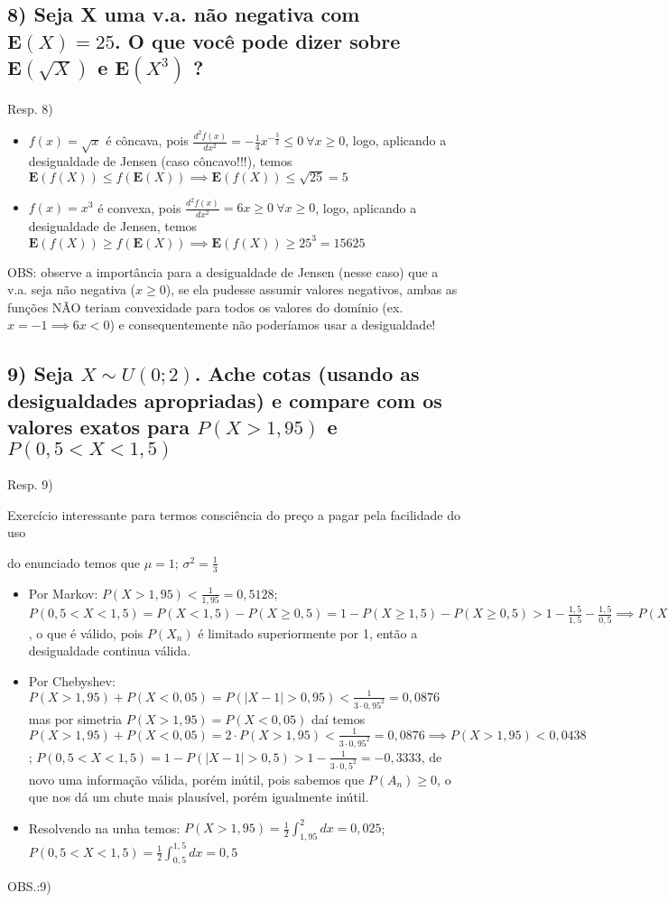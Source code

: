 \documentclass[english]{article}
\begin{document}
\subsection*{\textmd{8) Seja X uma v.a. não negativa com $\mathbf{E}(X)=25$.
O que você pode dizer sobre $\mathbf{E}(\sqrt{X})$ e $\mathbf{E}(X^{3})$
?}}

Resp. 8)
\begin{itemize}
\item $f(x)=\sqrt{x}$ é côncava, pois $\frac{d^{2}f(x)}{dx^{2}}=-\frac{1}{4}x^{-\frac{3}{2}}\le0\ \forall x\ge0$,
logo, aplicando a desigualdade de Jensen (caso côncavo!!!), temos
$\mathbf{E}(f(X))\le f(\mathbf{E}(X))\implies\mathbf{E}(f(X))\le\sqrt{25}=5$
\item $f(x)=x^{3}$ é convexa, pois $\frac{d^{2}f(x)}{dx^{2}}=6x\ge0\ \forall x\ge0$,
logo, aplicando a desigualdade de Jensen, temos $\mathbf{E}(f(X))\ge f(\mathbf{E}(X))\implies\mathbf{E}(f(X))\ge25^{3}=15625$
\end{itemize}
OBS: observe a importância para a desigualdade de Jensen (nesse caso)
que a v.a. seja não negativa ($x\ge0$), se ela pudesse assumir valores
negativos, ambas as funções NÃO teriam convexidade para todos os valores
do domínio (ex. $x=-1\implies6x<0$) e consequentemente não poderíamos
usar a desigualdade!


\subsubsection*{\textcompwordmark{}}


\subsection*{\textmd{9) Seja $X\sim U(0;2)$. Ache cotas (usando as desigualdades
apropriadas) e compare com os valores exatos para $P(X>1,95)$ e $P(0,5<X<1,5)$}}

Resp. 9)

Exercício interessante para termos consciência do preço a pagar pela
facilidade do uso

do enunciado temos que $\mu=1$; $\sigma^{2}=\frac{1}{3}$
\begin{itemize}
\item Por Markov: $P(X>1,95)<\frac{1}{1,95}=0,5128$; $P(0,5<X<1,5)=P(X<1,5)-P(X\ge0,5)=1-P(X\ge1,5)-P(X\ge0,5)>1-\frac{1,5}{1,5}-\frac{1,5}{0,5}\implies P(X\ge1,5)+P(X\ge0,5)<+\frac{1,5}{1,5}+\frac{1,5}{0,5}=5,5$,
o que é válido, pois $P(X_{n})$ é limitado superiormente por 1, então
a desigualdade continua válida.
\item Por Chebyshev: $P(X>1,95)+P(X<0,05)=P(\left|X-1\right|>0,95)<\frac{1}{3\cdot0,95^{2}}=0,0876$
mas por simetria $P(X>1,95)=P(X<0,05)$ daí temos $P(X>1,95)+P(X<0,05)=2\cdot P(X>1,95)<\frac{1}{3\cdot0,95^{2}}=0,0876\implies P(X>1,95)<0,0438$;
$P(0,5<X<1,5)=1-P(\left|X-1\right|>0,5)>1-\frac{1}{3\cdot0,5^{2}}=-0,3333$,
de novo uma informação válida, porém inútil, pois sabemos que $P(A_{n})\ge0$,
o que nos dá um chute mais plausível, porém igualmente inútil.
\item Resolvendo na unha temos: $P(X>1,95)=\frac{1}{2}\int_{1,95}^{2}dx=0,025$;
$P(0,5<X<1,5)=\frac{1}{2}\int_{0,5}^{1,5}dx=0,5$
\end{itemize}
OBS.:9)
\end{document}
